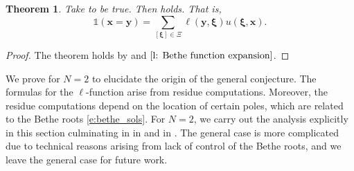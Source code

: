 \documentclass[a4paper,11pt]{article}
\newtheorem{theorem}{Theorem}[section]
\theoremstyle{definition}
\begin{document}
\begin{theorem}\label{t:N=2 theorem}
     Take  to be true. 
     Then  holds. That is,
    \begin{equation}
         \mathds{1}(\mathbf{x} = \mathbf{y}) =  \sum_{[\boldsymbol{\xi}] \in \Xi}  \ell(\mathbf{y}, \boldsymbol{\xi}) u(\boldsymbol{\xi}, \mathbf{x}).
    \end{equation}
\end{theorem}
\begin{proof}
The theorem holds by  and $\Cref{l: Bethe function expansion}$.     
\end{proof}


We prove  for $N=2$ to elucidate the origin of the general conjecture. The formulas for the $\ell$-function arise from residue computations. Moreover, the residue computations depend on the location of certain poles, which are related to the Bethe roots \eqref{e:bethe_sols}. For $N=2$, we carry out the analysis explicitly in this section culminating in  in  and  in . The general case is more complicated due to technical reasons arising from lack of control of the Bethe roots, and we leave the general case for future work.
\end{document}
